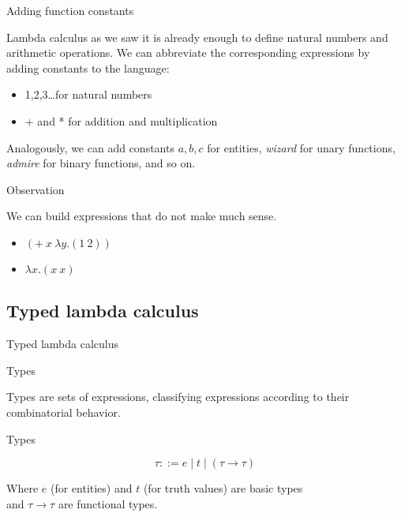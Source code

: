 \documentclass[xcolor=dvipsnames]{beamer}
\begin{document}
\begin{frame}{Adding function constants}

Lambda calculus as we saw it is already enough to define natural numbers 
and arithmetic operations. 
We can abbreviate the corresponding expressions by adding 
constants to the language: 
\begin{itemize}
\item 1,2,3\ldots for natural numbers
\item + and * for addition and multiplication
\end{itemize}

Analogously, we can add constants $a,b,c$ for entities, {\em wizard} for 
unary functions, {\em admire} for binary functions, and so on.
\end{frame}

\begin{frame}{Observation}

We can build expressions that do not make much sense.
\begin{itemize}
\item $(+\ x\ \lambda y.(1\ 2))$
\item $\lambda x.(x\ x)$
\end{itemize}
\end{frame}

\subsection{Typed lambda calculus}

\begin{frame}{}

\begin{center}
{\Large Typed lambda calculus}
\end{center}
\end{frame}

\begin{frame}{Types}

Types are sets of expressions, classifying expressions according to their combinatorial behavior.

\begin{block}{{\color{white}Types}}

\vspace{-.6cm}
 
$$ \tau ::= e \mid t \mid (\tau\to\tau) $$
\end{block}

Where $e$ (for entities) and $t$ (for truth values) are basic types\\
and {$\tau\to\tau$} are functional types.
\end{frame}
\end{document}
